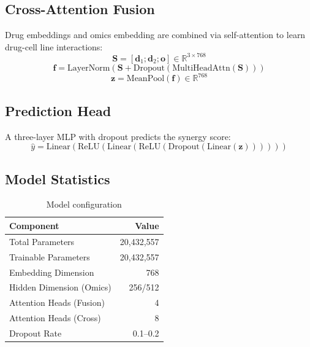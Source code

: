 \documentclass[10pt,twocolumn]{article}
\begin{document}
\subsection{Cross-Attention Fusion}

Drug embeddings and omics embedding are combined via self-attention to learn drug-cell line interactions:
\begin{equation}
\mathbf{S} = [\mathbf{d}_1; \mathbf{d}_2; \mathbf{o}] \in \mathbb{R}^{3 \times 768}
\end{equation}
\begin{equation}
\mathbf{f} = \text{LayerNorm}(\mathbf{S} + \text{Dropout}(\text{MultiHeadAttn}(\mathbf{S})))
\end{equation}
\begin{equation}
\mathbf{z} = \text{MeanPool}(\mathbf{f}) \in \mathbb{R}^{768}
\end{equation}

\subsection{Prediction Head}

A three-layer MLP with dropout predicts the synergy score:
\begin{equation}
\hat{y} = \text{Linear}(\text{ReLU}(\text{Linear}(\text{ReLU}(\text{Dropout}(\text{Linear}(\mathbf{z}))))))
\end{equation}

\subsection{Model Statistics}

\begin{table}[h]
\centering
\caption{Model configuration}
\label{tab:model}
\begin{tabular}{@{}lr@{}}
\toprule
\textbf{Component} & \textbf{Value} \\
\midrule
Total Parameters & 20,432,557 \\
Trainable Parameters & 20,432,557 \\
Embedding Dimension & 768 \\
Hidden Dimension (Omics) & 256/512 \\
Attention Heads (Fusion) & 4 \\
Attention Heads (Cross) & 8 \\
Dropout Rate & 0.1--0.2 \\
\bottomrule
\end{tabular}
\end{table}
\end{document}
